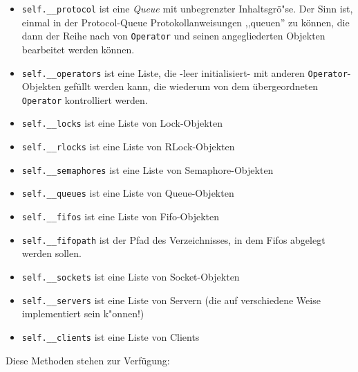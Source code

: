 \begin{itemize}
\item \texttt{self.\_\_protocol} ist eine \textit{Queue} mit
  unbegrenzter Inhaltsgr\"o"se. Der Sinn ist, einmal in der
  Protocol-Queue Protokollanweisungen ,,queuen'' zu k\"onnen, die dann
  der Reihe nach von \texttt{Operator} und seinen angegliederten
  Objekten bearbeitet werden k\"onnen.
\item \texttt{self.\_\_operators} ist eine Liste, die -leer
  initialisiert- mit anderen \texttt{Operator}-Objekten gef\"ullt
  werden kann, die wiederum von dem \"ubergeordneten \texttt{Operator}
  kontrolliert werden.
\item \texttt{self.\_\_locks} ist eine Liste von Lock-Objekten
\item \texttt{self.\_\_rlocks} ist eine Liste von RLock-Objekten
\item \texttt{self.\_\_semaphores} ist eine Liste von
  Semaphore-Objekten
\item \texttt{self.\_\_queues} ist eine Liste von Queue-Objekten
\item \texttt{self.\_\_fifos} ist eine Liste von Fifo-Objekten
\item \texttt{self.\_\_fifopath} ist der Pfad des Verzeichnisses, in
  dem Fifos abgelegt werden sollen.
\item \texttt{self.\_\_sockets} ist eine Liste von Socket-Objekten
\item \texttt{self.\_\_servers} ist eine Liste von Servern (die auf
  verschiedene Weise implementiert sein k"onnen!)
\item \texttt{self.\_\_clients} ist eine Liste von Clients
\end{itemize}

Diese Methoden stehen zur Verf\"ugung:

